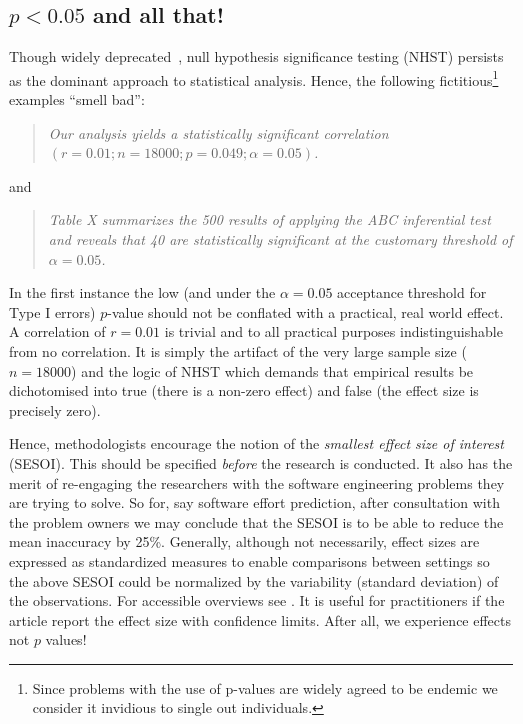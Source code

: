 \documentclass[10pt]{elsarticle}
\begin{document}
\subsection{$p<0.05$ and all that!}

Though widely deprecated~\cite{carver93,Simm11,Colq14},
 null hypothesis significance testing (NHST) persists as the dominant approach to statistical analysis. Hence, the following fictitious\footnote{Since problems with the use of p-values are widely agreed to be endemic \cite{Simm11,Jorg16} we consider it invidious to single out individuals.} examples ``smell bad'':
\begin{quote}
    {\em Our analysis yields a statistically significant correlation $(r = 0.01;n = 18000;p = 0.049;\alpha = 0.05)$.}
\end{quote}

\noindent
and

\begin{quote}
    {\em Table X summarizes the 500 results of applying the ABC inferential test and reveals that 40 are statistically significant at the customary threshold of $\alpha=0.05$.}
\end{quote}

\noindent
In the first instance the low (and under the $\alpha=0.05$ acceptance threshold for Type I errors)  $p$-value should not be conflated with a practical, real world effect.   A correlation of $r=0.01$ is trivial and to all practical purposes indistinguishable from no correlation.  It is simply the artifact of the very large sample size ($n=18000$) and the logic of NHST which demands that empirical results be dichotomised into true (there is a non-zero effect) and false (the effect size is precisely zero).  

Hence, methodologists encourage the notion of the {\em smallest effect size of interest} (SESOI).  This should be specified \textit{before} the research is conducted.  It also has the merit of re-engaging the researchers with the software engineering problems they are trying to solve.  So for, say software effort prediction, after consultation with the problem owners we may conclude that the SESOI is to be able to reduce the mean inaccuracy by 25\%. Generally, although not necessarily, effect sizes are expressed as standardized measures to enable comparisons between settings so the above SESOI could be normalized by the variability (standard deviation) of the observations. For accessible overviews see \cite{Elli10,Cohe92}.  It is useful for practitioners if the article report the effect size with confidence limits.  After all, we experience effects not $p$ values!
 
\end{document}
